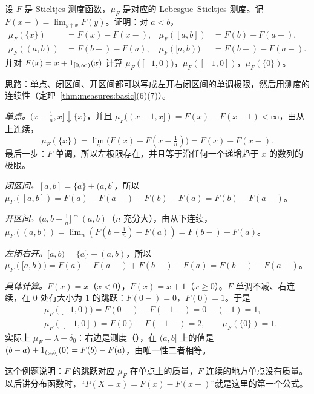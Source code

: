 \begin{workedexample}\label{we:extension:atoms}
设 $F$ 是 Stieltjes 测度函数，$\mu_F$ 是对应的 Lebesgue--Stieltjes 测度。记 $F(x-)=\lim_{y\uparrow x}F(y)$。证明：对 $a<b$，
\[
\begin{aligned}
\mu_F(\{x\})&=F(x)-F(x-),&\mu_F([a,b])&=F(b)-F(a-),\\
\mu_F((a,b))&=F(b-)-F(a),&\mu_F([a,b))&=F(b-)-F(a-).
\end{aligned}
\]
并对 $F(x)=x+1_{[0,\infty)}(x)$ 计算 $\mu_F([-1,0))$，$\mu_F([-1,0])$，$\mu_F(\{0\})$。
\end{workedexample}
\begin{solution}
思路：单点、闭区间、开区间都可以写成左开右闭区间的单调极限，然后用测度的连续性（定理~\ref{thm:measures:basic}(6)(7)）。

\emph{单点。}$(x-\frac1n,x]\downarrow\{x\}$，并且 $\mu_F((x-1,x])=F(x)-F(x-1)<\infty$，由从上连续，
\[
\mu_F(\{x\})=\lim_n\bigl(F(x)-F(x-\tfrac1n)\bigr)=F(x)-F(x-).
\]
最后一步：$F$ 单调，所以左极限存在，并且等于沿任何一个递增趋于 $x$ 的数列的极限。

\emph{闭区间。}$[a,b]=\{a\}+(a,b]$，所以 $\mu_F([a,b])=F(a)-F(a-)+F(b)-F(a)=F(b)-F(a-)$。

\emph{开区间。}$(a,b-\frac1n]\uparrow(a,b)$（$n$ 充分大），由从下连续，$\mu_F((a,b))=\lim_n(F(b-\frac1n)-F(a))=F(b-)-F(a)$。

\emph{左闭右开。}$[a,b)=\{a\}+(a,b)$，所以 $\mu_F([a,b))=F(a)-F(a-)+F(b-)-F(a)=F(b-)-F(a-)$。

\emph{具体计算。}$F(x)=x$（$x<0$），$F(x)=x+1$（$x\geqslant0$）。$F$ 单调不减、右连续，在 $0$ 处有大小为 $1$ 的跳跃：$F(0-)=0$，$F(0)=1$。于是
\[
\begin{aligned}
&\mu_F([-1,0))=F(0-)-F(-1-)=0-(-1)=1,\\
&\mu_F([-1,0])=F(0)-F(-1-)=2,\qquad\mu_F(\{0\})=1.
\end{aligned}
\]
实际上 $\mu_F=\lambda+\delta_0$：右边是测度（），在 $(a,b]$ 上的值是 $(b-a)+1_{(a,b]}(0)=F(b)-F(a)$，由唯一性二者相等。

这个例题说明：$F$ 的跳跃对应 $\mu_F$ 在单点上的质量，$F$ 连续的地方单点没有质量。以后讲分布函数时，“$P(X=x)=F(x)-F(x-)$”就是这里的第一个公式。
\end{solution}

